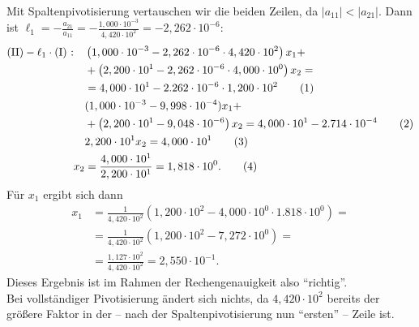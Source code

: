\documentclass[english, parskip=full]{scrartcl}
\newcommand\numberthis{\addtocounter{equation}{1}\tag{\theequation}}
\newcommand{\kla}{}
\newcommand{\tecxt}{}
\begin{document}
\\
Mit Spaltenpivotisierung vertauschen wir die beiden Zeilen, da $|a_{11}| < |a_{21}|$.
Dann ist $\ell_1 = -\frac{a_{21}}{a_{11}} = -\frac{1,000\cdot 10^{-3}}{4,420\cdot 10^2}  = -2,262\cdot 10^{-6}$:
\begin{align*}
\tecxt\text{(II)} - \ell_1\cdot \tecxt\text{(I)   :} \ \ \  &\kla\left( 1,000\cdot 10^{-3} - 2,262\cdot 10^{-6} \cdot 4,420\cdot 10^2 \right)x_1 + \\
& + \kla\left( 2,200\cdot 10^1 - 2,262\cdot 10^{-6} \cdot 4,000\cdot 10^0 \right)x_2 = \\
&= 4,000\cdot 10^1 - 2.262\cdot 10^{-6}\cdot 1,200\cdot 10^2 \numberthis\\
& (1,000\cdot 10^{-3} - 9,998\cdot 10^{-4})x_1 + \\
& + \kla\left( 2,200\cdot 10^1 - 9,048\cdot 10^{-6} \right)x_2 = 4,000\cdot 10^1 - 2.714\cdot 10^{-4} \numberthis\\
& 2,200\cdot 10^1 x_2 = 4,000\cdot 10^1  \numberthis\\
x_2 &= \frac{4,000\cdot 10^1}{2,200\cdot 10^1} = 1,818\cdot 10^0. \numberthis
\end{align*}
Für $x_1$ ergibt sich dann
\begin{align}
x_1 &= \frac{1}{4,420\cdot 10^{2}}\kla\left( 1,200\cdot 10^2 - 4,000\cdot 10^0 \cdot 1.818\cdot 10^0 \right) = \\
&= \frac{1}{4,420\cdot 10^{2}}\kla\left( 1,200\cdot 10^2 - 7,272\cdot 10^0 \right) = \\
&=\frac{1,127\cdot 10^2}{4,420\cdot 10^{2}} = 2,550\cdot 10^{-1}.
\end{align}
Dieses Ergebnis ist im Rahmen der Rechengenauigkeit also ``richtig''.
\\
Bei vollständiger Pivotisierung ändert sich nichts, da $4,420\cdot 10^2$ bereits der größere Faktor in der -- nach der Spaltenpivotisierung nun ``ersten'' --  Zeile ist.
\end{document}
